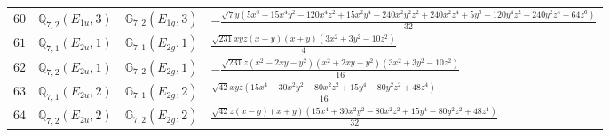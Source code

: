\documentclass[fleqn,8pt,landscape]{jsarticle}
\begin{document}
\begin{table}[ht!]
\begin{center}
\begin{tabular}{cccl}
$ 60 $ & $ \mathbb{Q}_{7,2}(E_{1u},3) $ & $ \mathbb{G}_{7,2}(E_{1g},3) $ & $ - \frac{\sqrt{7} y \left(5 x^{6} + 15 x^{4} y^{2} - 120 x^{4} z^{2} + 15 x^{2} y^{4} - 240 x^{2} y^{2} z^{2} + 240 x^{2} z^{4} + 5 y^{6} - 120 y^{4} z^{2} + 240 y^{2} z^{4} - 64 z^{6}\right)}{32} $ \\
$ 61 $ & $ \mathbb{Q}_{7,1}(E_{2u},1) $ & $ \mathbb{G}_{7,1}(E_{2g},1) $ & $ \frac{\sqrt{231} x y z \left(x - y\right) \left(x + y\right) \left(3 x^{2} + 3 y^{2} - 10 z^{2}\right)}{4} $ \\
$ 62 $ & $ \mathbb{Q}_{7,2}(E_{2u},1) $ & $ \mathbb{G}_{7,2}(E_{2g},1) $ & $ - \frac{\sqrt{231} z \left(x^{2} - 2 x y - y^{2}\right) \left(x^{2} + 2 x y - y^{2}\right) \left(3 x^{2} + 3 y^{2} - 10 z^{2}\right)}{16} $ \\
$ 63 $ & $ \mathbb{Q}_{7,1}(E_{2u},2) $ & $ \mathbb{G}_{7,1}(E_{2g},2) $ & $ \frac{\sqrt{42} x y z \left(15 x^{4} + 30 x^{2} y^{2} - 80 x^{2} z^{2} + 15 y^{4} - 80 y^{2} z^{2} + 48 z^{4}\right)}{16} $ \\
$ 64 $ & $ \mathbb{Q}_{7,2}(E_{2u},2) $ & $ \mathbb{G}_{7,2}(E_{2g},2) $ & $ \frac{\sqrt{42} z \left(x - y\right) \left(x + y\right) \left(15 x^{4} + 30 x^{2} y^{2} - 80 x^{2} z^{2} + 15 y^{4} - 80 y^{2} z^{2} + 48 z^{4}\right)}{32} $ \\
 \hline \hline
\end{tabular}
\end{center}
\end{table}
\end{document}
